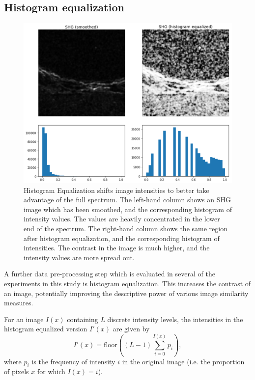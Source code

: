 \documentclass{report}
\begin{document}
\subsection{Histogram equalization}
\label{sec:histeq}
\begin{figure}
\centering
\includegraphics[width = 5.5 in]{histogram_equalization.pdf}
\caption{Histogram Equalization shifts image intensities to better take advantage of the full spectrum. The left-hand column shows an SHG image which has been smoothed, and the corresponding histogram of intensity values. The values are heavily concentrated in the lower end of the spectrum. The right-hand column shows the same region after histogram equalization, and the corresponding histogram of intensities. The contrast in the image is much higher, and the intensity values are more spread out.}
\label{fig:hist_equalization}
\end{figure}
A further data pre-processing step which is evaluated in several of the experiments in this study is histogram equalization. This increases the contrast of an image, potentially improving the descriptive power of various image similarity measures.

For an image $I(x)$ containing $L$ discrete intensity levels, the intensities in the histogram equalized version $I'(x)$ are given by
\begin{equation}
I'(x) = \text{floor}((L-1)\sum_{i=0}^{I(x)}p_i),
\end{equation}
where $p_i$ is the frequency of intensity $i$ in the original image (i.e. the proportion of pixels $x$ for which $I(x)=i$).
\end{document}
